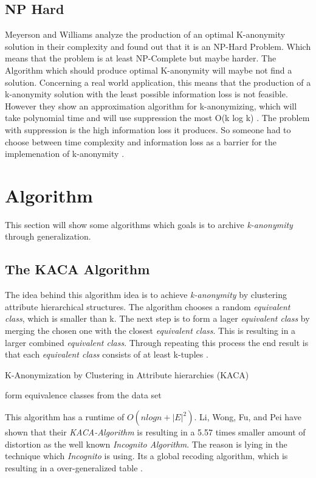\documentclass{llncs}
\begin{document}
\subsection{NP Hard}
Meyerson and Williams analyze the production of an optimal K-anonymity solution in their complexity and found out that it is an NP-Hard Problem. Which means that the problem is at least NP-Complete but maybe harder. The Algorithm which should produce optimal K-anonymity will maybe not find a solution. Concerning a real world application, this means that the production of a k-anonymity solution with the least possible information loss is not feasible. However they show an approximation algorithm for k-anonymizing, which will take polynomial time and will use suppression the most O(k log k)  \cite{sweeney2002k}. The problem with suppression is the high information loss it produces. So someone had to choose between time complexity and information loss as a barrier for the implemenation of k-anonymity \cite{el2009globally}. 



\section{Algorithm}
This section will show some algorithms which goals is to archive \textit{k-anonymity} through generalization. 

\subsection{The KACA Algorithm}
The idea behind this algorithm idea is to achieve \textit{k-anonymity} by clustering attribute hierarchical structures. The algorithm chooses a random \textit{equivalent class}, which is smaller than k. The next step is to form a lager \textit{equivalent class} by merging the chosen one with the closest \textit{equivalent class}. This is resulting in a larger combined \textit{equivalent class}. Through repeating this process the end result is that each \textit{equivalent class} consists of at least k-tuples \cite{li2006achieving}.\\
\begin{algorithm}[H]
	\caption{K-Anonymization by Clustering in Attribute hierarchies (KACA) \cite{li2006achieving}}
	form equivalence classes from the data set\\
\end{algorithm}
This algorithm has a runtime of $O(nlogn + |E|^{2})$. Li, Wong, Fu, and Pei have shown that their \textit{KACA-Algorithm} is resulting in a 5.57 times smaller amount of distortion as the well known \textit{Incognito Algorithm}. The reason is lying in the technique which \textit{Incognito} is using. Its a global recoding algorithm, which is resulting in a over-generalized table \cite{li2006achieving}.
\end{document}

